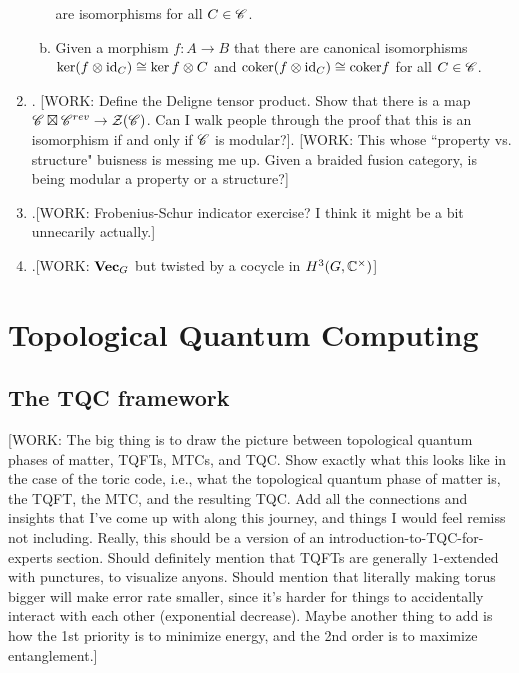 \documentclass{article}
\theoremstyle{definition}
\numberwithin{figure}{section}
\begin{document}
\begin{enumerate}[\thesection .1.]
\begin{enumerate}[(a)]
are isomorphisms for all $C\in \mathscr{C}$.

\item Given a morphism $f:A\to B$ that there are canonical isomorphisms $\ker (f\otimes \mathrm{id}_C)\cong \ker f\otimes C$ and $\mathrm{coker} (f\otimes \mathrm{id}_C)\cong \mathrm{coker} f$ for all $C\in \mathscr{C}$.
\end{enumerate}

\item . [WORK: Define the Deligne tensor product. Show that there is a map $\mathscr{C}\boxtimes \mathscr{C}^{rev}\to \mathcal{Z}(\mathscr{C})$. Can I walk people through the proof that this is an isomorphism if and only if $\mathscr{C}$ is modular?]. [WORK: This whose ``property vs. structure" buisness is messing me up. Given a braided fusion category, is being modular a property or a structure?]

\item .[WORK: Frobenius-Schur indicator exercise? I think it might be a bit unnecarily actually.]

\item .[WORK: $\bold{Vec}_G$ but twisted by a cocycle in $H^3(G,\mathbb{C}^{\times})$]
\end{enumerate}

\section{Topological Quantum Computing}
\label{Topological Quantum Computing}

\subsection{The TQC framework}
\label{The TQC framework}

[WORK: The big thing is to draw the picture between topological quantum phases of matter, TQFTs, MTCs, and TQC. Show exactly what this looks like in the case of the toric code, i.e., what the topological quantum phase of matter is, the TQFT, the MTC, and the resulting TQC. Add all the connections and insights that I've come up with along this journey, and things I would feel remiss not including. Really, this should be a version of an introduction-to-TQC-for-experts section. Should definitely mention that TQFTs are generally $1$-extended with punctures, to visualize anyons. Should mention that literally making torus bigger will make error rate smaller, since it's harder for things to accidentally interact with each other (exponential decrease). Maybe another thing to add is how the 1st priority is to minimize energy, and the 2nd order is to maximize entanglement.]
\end{document}
